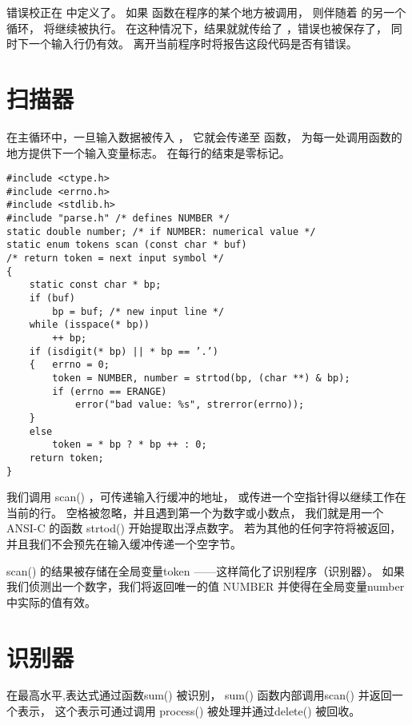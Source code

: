 错误校正在  中定义了。
如果  函数在程序的某个地方被调用，
则伴随着  的另一个循环， 将继续被执行。
在这种情况下，结果就就传给了 ，错误也被保存了，
同时下一个输入行仍有效。
离开当前程序时将报告这段代码是否有错误。


\section{扫描器}
\label{sec:scanner}

在主循环中，一旦输入数据被传入 ，
它就会传递至  函数，
为每一处调用函数的地方提供下一个输入变量标志。
在每行的结束是零标记。

\begin{lstlisting}
#include <ctype.h>
#include <errno.h>
#include <stdlib.h>
#include "parse.h" /* defines NUMBER */
static double number; /* if NUMBER: numerical value */
static enum tokens scan (const char * buf)
/* return token = next input symbol */
{   
    static const char * bp;
    if (buf)
        bp = buf; /* new input line */
    while (isspace(* bp))
        ++ bp;
    if (isdigit(* bp) || * bp == ’.’)
    {   errno = 0;
        token = NUMBER, number = strtod(bp, (char **) & bp);
        if (errno == ERANGE)
            error("bad value: %s", strerror(errno));
    }
    else
        token = * bp ? * bp ++ : 0;
    return token;
}
\end{lstlisting}

我们调用 scan() ，可传递输入行缓冲的地址，
或传进一个空指针得以继续工作在当前的行。
空格被忽略，并且遇到第一个为数字或小数点，
我们就是用一个ANSI-C 的函数 strtod() 开始提取出浮点数字。
若为其他的任何字符将被返回，并且我们不会预先在输入缓冲传递一个空字节。


scan() 的结果被存储在全局变量token ——这样简化了识别程序（识别器）。
如果我们侦测出一个数字，我们将返回唯一的值 NUMBER 并使得在全局变量number 
中实际的值有效。


\section{识别器}
\label{sec:recogn}
在最高水平,表达式通过函数sum() 被识别，
sum() 函数内部调用scan() 并返回一个表示，
这个表示可通过调用 process() 
被处理并通过delete() 被回收。


